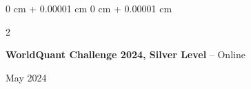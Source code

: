 \documentclass[10pt, letterpaper]{article}
\newenvironment{highlights}{
    \begin{itemize}[
        topsep=0.10 cm,
        parsep=0.10 cm,
        partopsep=0pt,
        itemsep=0pt,
        leftmargin=0 cm + 10pt
    ]
}{
    \end{itemize}
} %
\newenvironment{onecolentry}{
    \begin{adjustwidth}{
        0 cm + 0.00001 cm
    }{
        0 cm + 0.00001 cm
    }
}{
    \end{adjustwidth}
} %
\newenvironment{twocolentry}[2][]{
    \onecolentry
    \def\secondColumn{#2}
    \setcolumnwidth{\fill, 5.2 cm}
    \begin{paracol}{2}
}{
    \switchcolumn \raggedleft \secondColumn
    \end{paracol}
    \endonecolentry
} %
\begin{document}
    
    \vspace{0.1 cm}
    
    \begin{twocolentry}{
        May 2024
    }
        \textbf{WorldQuant Challenge 2024, Silver Level} -- Online
    \end{twocolentry}
    
    
        
    
\end{document}
